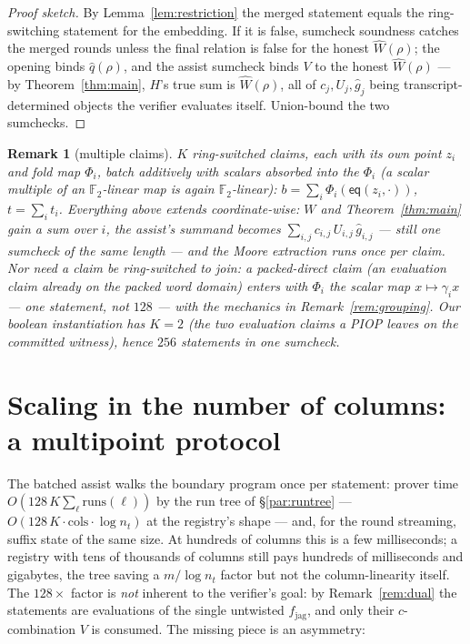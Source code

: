 \documentclass[11pt]{article}
\newcommand{\F}{\mathbb{F}}
\newcommand{\Ftwo}{\F_2}
\newcommand{\eq}{\mathsf{eq}}
\newcommand{\fjag}{\hat f_{\mathrm{jag}}}
\newtheorem{remark}[theorem]{Remark}
\begin{document}
\begin{proof}[Proof sketch]
By Lemma~\ref{lem:restriction} the merged statement equals the
ring-switching statement for the embedding. If it is false, sumcheck
soundness catches the merged rounds unless the final relation is false
for the honest $\widehat W(\rho)$; the opening binds $\hat q(\rho)$,
and the assist sumcheck binds $V$ to the honest $\widehat W(\rho)$ ---
by Theorem~\ref{thm:main}, $H$'s true sum is $\widehat W(\rho)$, all
of $c_{j}, U_{j}, \hat g_{j}$ being transcript-determined objects the
verifier evaluates itself. Union-bound the two sumchecks.
\end{proof}

\begin{remark}[multiple claims]\label{rem:multi}
$K$ ring-switched claims, each with its own point $z_i$ and fold map
$\Phi_i$, batch additively with scalars absorbed into the $\Phi_i$ (a
scalar multiple of an $\Ftwo$-linear map is again $\Ftwo$-linear):
$b = \sum_i \Phi_i(\eq(z_i, \cdot))$, $t = \sum_i t_i$. Everything
above extends coordinate-wise: $W$ and Theorem~\ref{thm:main} gain a
sum over $i$, the assist's summand becomes
$\sum_{i,j} c_{i,j}\, U_{i,j}\, \hat g_{i,j}$ --- still one sumcheck
of the same length --- and the Moore extraction runs once per claim.
Nor need a claim be ring-switched to join: a \emph{packed-direct}
claim (an evaluation claim already on the packed word domain) enters
with $\Phi_i$ the scalar map $x \mapsto \gamma_i x$ --- one statement,
not $128$ --- with the mechanics in Remark~\ref{rem:grouping}. Our
boolean instantiation has $K = 2$ (the two evaluation claims a PIOP
leaves on the committed witness), hence $256$ statements in one
sumcheck.
\end{remark}

\section{Scaling in the number of columns: a multipoint
protocol}\label{sec:multipoint}

The batched assist walks the boundary program once per statement:
prover time $O(128\,K \sum_\ell \mathrm{runs}(\ell))$ by the run tree
of \S\ref{par:runtree} --- $O(128\,K \cdot \mathrm{cols}\cdot\log n_t)$
at the registry's shape --- and, for the round streaming, suffix state
of the same size. At hundreds of columns this is a few milliseconds; a
registry with tens of thousands of columns still pays hundreds of
milliseconds and gigabytes, the tree saving a $m/\log n_t$ factor but
not the column-linearity itself. The
$128\times$ factor is \emph{not} inherent to the verifier's goal: by
Remark~\ref{rem:dual} the statements are evaluations of the single
untwisted $\fjag$, and only their $c$-combination $V$ is consumed. The
missing piece is an asymmetry:
\end{document}

